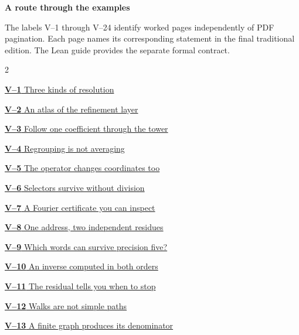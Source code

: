 \documentclass[11pt,a4paper]{article}
\begin{document}
\KomorebiCover
{}


{\sffamily\bfseries\Large\color{accent}A route through the examples}\par\medskip
The labels V--1 through V--24 identify worked pages independently of PDF
pagination. Each page names its corresponding statement in the final
traditional edition. The Lean guide provides the separate formal contract.
\medskip
\begin{multicols}{2}
{\small\noindent\hyperlink{vpage1}{\textbf{V--1} Three kinds of resolution}\par\smallskip}
{\small\noindent\hyperlink{vpage2}{\textbf{V--2} An atlas of the refinement layer}\par\smallskip}
{\small\noindent\hyperlink{vpage3}{\textbf{V--3} Follow one coefficient through the tower}\par\smallskip}
{\small\noindent\hyperlink{vpage4}{\textbf{V--4} Regrouping is not averaging}\par\smallskip}
{\small\noindent\hyperlink{vpage5}{\textbf{V--5} The operator changes coordinates too}\par\smallskip}
{\small\noindent\hyperlink{vpage6}{\textbf{V--6} Selectors survive without division}\par\smallskip}
{\small\noindent\hyperlink{vpage7}{\textbf{V--7} A Fourier certificate you can inspect}\par\smallskip}
{\small\noindent\hyperlink{vpage8}{\textbf{V--8} One address, two independent residues}\par\smallskip}
{\small\noindent\hyperlink{vpage9}{\textbf{V--9} Which words can survive precision five?}\par\smallskip}
{\small\noindent\hyperlink{vpage10}{\textbf{V--10} An inverse computed in both orders}\par\smallskip}
{\small\noindent\hyperlink{vpage11}{\textbf{V--11} The residual tells you when to stop}\par\smallskip}
{\small\noindent\hyperlink{vpage12}{\textbf{V--12} Walks are not simple paths}\par\smallskip}
{\small\noindent\hyperlink{vpage13}{\textbf{V--13} A finite graph produces its denominator}\par\smallskip}

\end{multicols}
\end{document}
